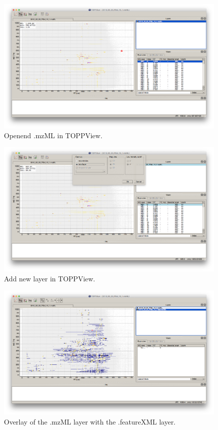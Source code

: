 \begin{figure}[htbp]
  \centering
  \includegraphics[width=\textwidth]{graphics/metabo/ToppView_1.png}
  \caption{Openend .mzML in TOPPView.}
  \label{fig:ToppView_1}
\end{figure}

\begin{figure}[htbp]
  \centering
  \includegraphics[width=\textwidth]{graphics/metabo/ToppView_2.png}
  \caption{Add new layer in TOPPView.}
  \label{fig:ToppView_2}
\end{figure}

\begin{figure}[htbp]
  \centering
  \includegraphics[width=\textwidth]{graphics/metabo/ToppView_3.png}
  \caption{Overlay of the .mzML layer with the .featureXML layer. }
  \label{fig:ToppView_3}
\end{figure}

